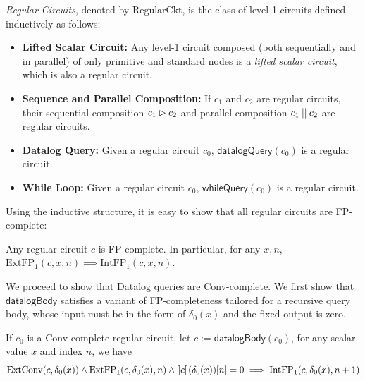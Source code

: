 \begin{definition}
    \emph{Regular Circuits}, denoted by $\text{RegularCkt}$, is the class of level-1 circuits defined inductively as follows:
    \begin{itemize}
        \item \textbf{Lifted Scalar Circuit:} Any level-1 circuit composed (both sequentially and in parallel) of only primitive and standard nodes is a \emph{lifted scalar circuit}, which is also a regular circuit.
        \item \textbf{Sequence and Parallel Composition:} If $c_1$ and $c_2$ are regular circuits, their sequential composition $c_1 \mathbin{\vartriangleright} c_2$ and parallel composition $c_1 \mathbin{||} c_2$ are regular circuits.
        \item \textbf{Datalog Query:} Given a regular circuit $c_0$, $\mathsf{datalogQuery}(c_0)$ is a regular circuit.
        \item \textbf{While Loop:} Given a regular circuit $c_0$, $\mathsf{whileQuery}(c_0)$ is a regular circuit.
    \end{itemize}
\end{definition}

Using the inductive structure, it is easy to show that all regular circuits are FP-complete:
\begin{lemma}
    Any regular circuit $c$ is FP-complete. In particular, for any $x, n$, $\text{ExtFP}_1(c, x, n) \implies \text{IntFP}_1(c, x, n)$.
\end{lemma}

We proceed to show that Datalog queries are Conv-complete. We first show that $\mathsf{datalogBody}$ satisfies a variant of FP-completeness tailored for a recursive query body, whose input must be in the form of $\delta_0(x)$ and the fixed output is zero.
\begin{lemma}\label{thm:datalog-body-fpcomplete}
    If $c_0$ is a Conv-complete regular circuit, let $c := \mathsf{datalogBody}(c_0)$, for any scalar value $x$ and index $n$, we have
    \[ 
    \text{ExtConv}(c, \delta_0(x)) \land
    \text{ExtFP}_1(c, \delta_0(x), n) \land
    \llbracket c \rrbracket(\delta_0(x))[n] = 0 \implies
    \text{IntFP}_1(c, \delta_0(x), n+1) \]
\end{lemma}

